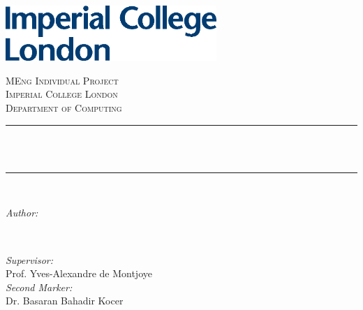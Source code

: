 \begin{titlepage}

\newcommand{\HRule}{\rule{\linewidth}{0.5mm}} 


\includegraphics[width=8cm]{title/logo.eps}\\[1cm]
 

\center %


\textsc{\LARGE MEng Individual Project}\\[1.5cm] 
\textsc{\Large Imperial College London}\\[0.5cm]
\textsc{\large Department of Computing}\\[0.5cm]

\makeatletter
\HRule \\[0.4cm]
{ \huge \bfseries \@title}\\[0.4cm]
\HRule \\[1.5cm]
 

\begin{minipage}{0.4\textwidth}
\begin{flushleft} \large
\emph{Author:}\\
\@author %
\end{flushleft}
\end{minipage}
~
\begin{minipage}{0.4\textwidth}
\begin{flushright} \large
\emph{Supervisor:} \\
Prof. Yves-Alexandre de Montjoye \\[1.2em]
\emph{Second Marker:} \\
Dr. Basaran Bahadir Kocer
\end{flushright}
\end{minipage}\\[2cm]
\makeatother


\end{titlepage}
